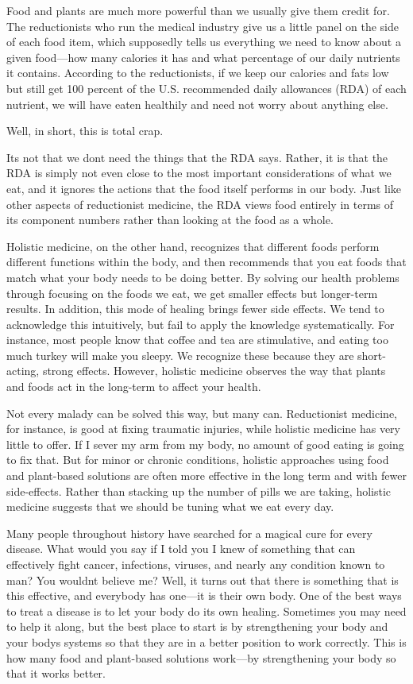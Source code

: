 Food and plants are much more powerful than we usually give them credit
for. The reductionists who run the medical industry give us a little
panel on the side of each food item, which supposedly tells us
everything we need to know about a given food—how many calories it has
and what percentage of our daily nutrients it contains. According to
the reductionists, if we keep our calories and fats low but still get
100 percent of the U.S. recommended daily allowances (RDA) of each
nutrient, we will have eaten healthily and need not worry about
anything else.

Well, in short, this is total crap.

It{\textquotesingle}s not that we don{\textquotesingle}t need the things
that the RDA says. Rather, it is that the RDA is simply not even close
to the most important considerations of what we eat, and it ignores the
actions that the food itself performs in our body. Just like other
aspects of reductionist medicine, the RDA views food entirely in terms
of its component numbers rather than looking at the food as a whole. 

Holistic medicine, on the other hand, recognizes that different foods
perform different functions within the body, and then recommends that
you eat foods that match what your body needs to be doing better. By
solving our health problems
through focusing on
the foods we eat, we get smaller effects but longer-term results. In
addition, this mode of healing brings fewer side effects.  We tend to
acknowledge this intuitively, but fail to apply the knowledge
systematically.  For instance, most people know that coffee and tea are
stimulative, and eating too much turkey will make you sleepy.  We
recognize these because they are short-acting, strong effects. 
However, holistic medicine observes the way that plants and foods act
in the long-term to affect your health.

Not every malady can be solved this way, but many can. Reductionist
medicine, for instance, is good at fixing traumatic injuries, while
holistic medicine has very little to offer. If I sever my arm from my
body, no amount of good eating is going to fix that. But for minor or
chronic conditions, holistic approaches using food and plant-based
solutions are often more effective in the long term
and with fewer
side-effects.  Rather than stacking up the number of pills we are
taking, holistic medicine suggests that we should be tuning what we eat
every day.

Many people throughout history have searched for a magical cure for
every disease. What would you say if I told you I knew of something
that can effectively
fight cancer, infections, viruses, and nearly any condition
known to man?  You
wouldn{\textquotesingle}t believe me?  Well, it turns out that there is
something that is this effective, and everybody has one—it is their own
body. One of the best
ways to treat a
disease is to let
your body do its own healing. Sometimes you may need to help it along,
but the best place to start is by strengthening your body and your
body{\textquotesingle}s systems so that they are in a better position
to work correctly. This is how many food and plant-based solutions
work—by strengthening your body so that it works better.

